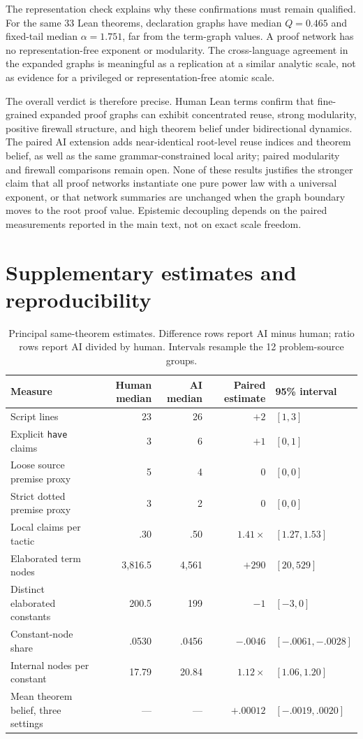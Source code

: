 \documentclass[11pt]{article}
\newcommand{\code}[1]{\texttt{#1}}
\begin{document}
The representation check explains why these confirmations must remain qualified.  For the same 33
Lean theorems, declaration graphs have median $Q=0.465$ and fixed-tail median $\alpha=1.751$, far from
the term-graph values.  A proof network has no representation-free exponent or modularity.  The
cross-language agreement in the expanded graphs is meaningful as a replication at a similar
analytic scale, not as evidence for a privileged or representation-free atomic scale.

The overall verdict is therefore precise.  Human Lean terms confirm that fine-grained expanded
proof graphs can exhibit concentrated reuse, strong modularity, positive firewall structure, and
high theorem belief under bidirectional dynamics.  The paired AI extension adds near-identical
root-level reuse indices and theorem belief, as well as the same grammar-constrained local arity;
paired modularity and firewall comparisons remain open.  None of these results justifies the
stronger claim that all proof networks instantiate one pure power law with a universal exponent,
or that network summaries are unchanged when the graph boundary moves to the root proof value.
Epistemic decoupling depends on the paired measurements reported in the main text, not on exact
scale freedom.

\section{Supplementary estimates and reproducibility}
\label{app:repro}

\begin{table}[ht]
\centering
\caption{Principal same-theorem estimates.  Difference rows report AI minus human; ratio rows report
AI divided by human.  Intervals resample the 12 problem-source groups.}
\label{tab:estimates}
\small
\begin{tabularx}{\textwidth}{YrrrY}
\toprule
Measure & Human median & AI median & Paired estimate & 95\% interval \\
\midrule
Script lines & 23 & 26 & $+2$ & $[1,3]$ \\
Explicit \code{have} claims & 3 & 6 & $+1$ & $[0,1]$ \\
Loose source premise proxy & 5 & 4 & $0$ & $[0,0]$ \\
Strict dotted premise proxy & 3 & 2 & $0$ & $[0,0]$ \\
Local claims per tactic & .30 & .50 & $1.41\times$ & $[1.27,1.53]$ \\
Elaborated term nodes & 3,816.5 & 4,561 & $+290$ & $[20,529]$ \\
Distinct elaborated constants & 200.5 & 199 & $-1$ & $[-3,0]$ \\
Constant-node share & .0530 & .0456 & $-.0046$ & $[-.0061,-.0028]$ \\
Internal nodes per constant & 17.79 & 20.84 & $1.12\times$ & $[1.06,1.20]$ \\
Mean theorem belief, three settings & --- & --- & $+.00012$ & $[-.0019,.0020]$ \\
\bottomrule
\end{tabularx}
\end{table}
\end{document}
